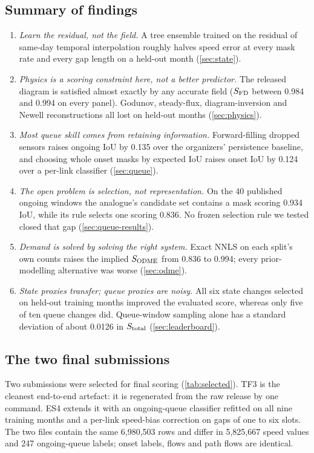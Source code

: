 \subsection{Summary of findings}\label{sec:findings}
\begin{enumerate}
  \item \emph{Learn the residual, not the field.} A tree ensemble trained on the residual of same-day temporal
        interpolation roughly halves speed error at every mask rate and every gap length on a held-out month
        (\cref{sec:state}).
  \item \emph{Physics is a scoring constraint here, not a better predictor.} The released diagram is satisfied almost
        exactly by any accurate field ($S_{\mathrm{FD}}$ between 0.984 and 0.994 on every panel). Godunov, steady-flux,
        diagram-inversion and Newell reconstructions all lost on held-out months (\cref{sec:physics}).
  \item \emph{Most queue skill comes from retaining information.} Forward-filling dropped sensors raises ongoing IoU by
        0.135 over the organizers' persistence baseline, and choosing whole onset masks by expected IoU raises onset IoU
        by 0.124 over a per-link classifier (\cref{sec:queue}).
  \item \emph{The open problem is selection, not representation.} On the 40 published ongoing windows the analogue's
        candidate set contains a mask scoring 0.934 IoU, while its rule selects one scoring 0.836. No frozen selection
        rule we tested closed that gap (\cref{sec:queue-results}).
  \item \emph{Demand is solved by solving the right system.} Exact NNLS on each split's own counts raises the implied
        $S_{\mathrm{ODME}}$ from 0.836 to 0.994; every prior-modelling alternative was worse (\cref{sec:odme}).
  \item \emph{State proxies transfer; queue proxies are noisy.} All six state changes selected on held-out training
        months improved the evaluated score, whereas only five of ten queue changes did. Queue-window sampling alone
        has a standard deviation of about 0.0126 in $S_{\mathrm{total}}$ (\cref{sec:leaderboard}).
\end{enumerate}

\subsection{The two final submissions}
Two submissions were selected for final scoring (\cref{tab:selected}). TF3 is the cleanest end-to-end artefact: it
is regenerated from the raw release by one command. ES4 extends it with an ongoing-queue classifier refitted on all
nine training months and a per-link speed-bias correction on gaps of one to six slots. The two files contain the same
6,980,503 rows and differ in 5,825,667 speed values and 247 ongoing-queue labels; onset labels, flows and path
flows are identical.

